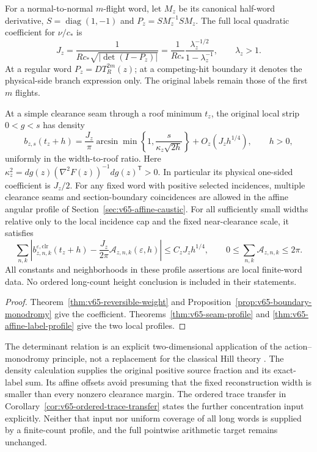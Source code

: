 \begin{leadtheorem}
\label{thm:intro-v65-caustic}
For a normal-to-normal $m$-flight word, let $M_z$ be its canonical
half-word derivative, $S=\operatorname{diag}(1,-1)$ and
$P_z=S M_z^{-1}S M_z$. The full local quadratic coefficient for
$\nu/c_*$ is
\[
 J_z=\frac{1}{R c_*\sqrt{|\det(I-P_z)|}}
     =\frac{1}{R c_*}\frac{\lambda_z^{-1/2}}{1-\lambda_z^{-1}},
          \qquad\lambda_z>1.
\]
At a regular word $P_z=D T_R^{2m}(z)$; at a competing-hit boundary
it denotes the physical-side branch expression only. The original
labels remain those of the first $m$ flights.

At a simple clearance seam through a roof minimum $t_z$, the
original local strip $0<g<s$ has density
\[
 b_{z,s}(t_z+h)=\frac{J_z}{\pi}
     \arcsin\!\min\left\{1,\frac{s}{\kappa_z\sqrt{2h}}\right\}
          +O_z(J_zh^{1/4}),\qquad h>0,
\]
uniformly in the width-to-roof ratio. Here
$\kappa_z^2=dg(z)(\nabla^2F(z))^{-1}dg(z)^{\mathsf T}>0$.
In particular its physical one-sided coefficient is $J_z/2$.
For any fixed word with positive selected incidences, multiple
clearance seams and section-boundary coincidences are allowed in
the affine angular profile of Section~\ref{sec:v65-affine-caustic}.
For all sufficiently small widths relative only to the local
incidence cap and the fixed near-clearance scale, it satisfies
\[
 \sum_{n,k}\left|b_{z,n,k}^{\varepsilon,\mathrm{clr}}(t_z+h)
       -\frac{J_z}{2\pi}\mathcal A_{z,n,k}(\varepsilon,h)\right|
                    \le C_zJ_zh^{1/4},\qquad
          0\le\sum_{n,k}\mathcal A_{z,n,k}\le2\pi.
\]
All constants and neighborhoods in these profile assertions are local
finite-word data. No ordered long-count height conclusion is included
in their statements.
\end{leadtheorem}
\begin{proof}
Theorem~\ref{thm:v65-reversible-weight} and
Proposition~\ref{prop:v65-boundary-monodromy} give the coefficient.
Theorems~\ref{thm:v65-seam-profile} and
\ref{thm:v65-affine-label-profile} give the two local profiles.
\end{proof}

The determinant relation is an explicit two-dimensional application
of the action--monodromy principle, not a replacement for the
classical Hill theory \cite{BT65}. The density calculation supplies
the original positive source fraction and its exact-label sum.
Its affine offsets avoid presuming that the fixed reconstruction
width is smaller than every nonzero clearance margin. The ordered
trace transfer in Corollary~\ref{cor:v65-ordered-trace-transfer}
states the further concentration input explicitly. Neither that input
nor uniform coverage of all long words is supplied by a finite-count
profile, and the full pointwise arithmetic target remains unchanged.

